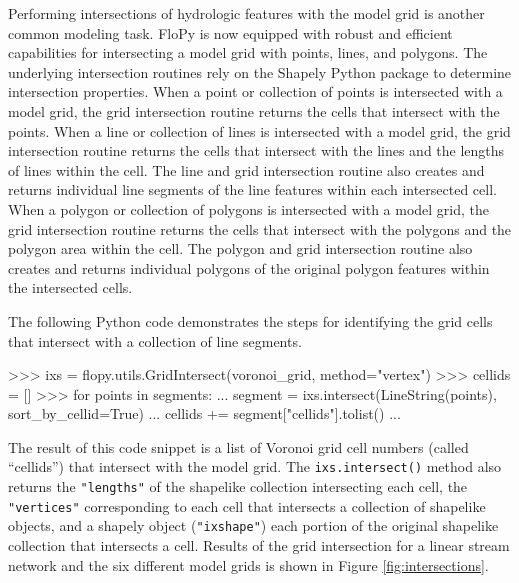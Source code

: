 \documentclass[11pt, oneside]{article}  	%
\begin{document}
Performing intersections of hydrologic features with the model grid is another common modeling task. FloPy is now equipped with robust and efficient capabilities for intersecting a model grid with points, lines, and polygons. The underlying intersection routines rely on the Shapely Python package \citep{shapely-gillies} to determine intersection properties. When a point or collection of points is intersected with a model grid, the grid intersection routine returns the cells that intersect with the points. When a line or collection of lines is intersected with a model grid, the grid intersection routine returns the cells that intersect with the lines and the lengths of lines within the cell. The line and grid intersection routine also creates and returns individual line segments of the line features within each intersected cell. When a polygon or collection of polygons is intersected with a model grid, the grid intersection routine returns the cells that intersect with the polygons and the polygon area within the cell. The polygon and grid intersection routine also creates and returns individual polygons of the original polygon features within the intersected cells.

The following Python code demonstrates the steps for identifying the grid cells that intersect with a collection of line segments.

\begin{python}
>>> ixs = flopy.utils.GridIntersect(voronoi_grid, method="vertex")
>>> cellids = []
>>> for points in segments:
...   segment = ixs.intersect(LineString(points), sort_by_cellid=True)
...   cellids += segment["cellids"].tolist()
...
\end{python}

\noindent The result of this code snippet is a list of Voronoi grid cell numbers (called ``cellids'') that intersect with the model grid.  The \texttt{ixs.intersect()} method also returns the \texttt{"lengths"} of the shapelike collection intersecting each cell, the \texttt{"vertices"} corresponding to each cell that intersects a collection of shapelike objects, and a shapely object (\texttt{"ixshape"}) each portion of the original shapelike collection that intersects a cell. Results of the grid intersection for a linear stream network and the six different model grids is shown in Figure \ref{fig:intersections}.
\end{document}
